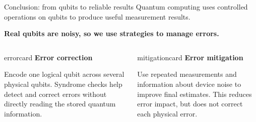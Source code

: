 \begin{frame}{Conclusion: from qubits to reliable results}
  \small
  Quantum computing uses controlled operations on qubits to produce useful
  measurement results.

  \vspace{0.65em}
  \begin{center}
  \end{center}

  \vspace{0.55em}
  \begin{center}
    \textbf{Real qubits are noisy, so we use strategies to manage errors.}
  \end{center}

  \vspace{0.25em}
  \begin{columns}[T,onlytextwidth]
    \begin{beamercolorbox}[wd=\linewidth,sep=0.75em,rounded=true]{errorcard}
      \textbf{Error correction}\par
      \vspace{0.25em}
      Encode one logical qubit across several physical qubits. Syndrome checks
      help detect and correct errors without directly reading the stored
      quantum information.
    \end{beamercolorbox}

    \begin{beamercolorbox}[wd=\linewidth,sep=0.75em,rounded=true]{mitigationcard}
      \textbf{Error mitigation}\par
      \vspace{0.25em}
      Use repeated measurements and information about device noise to improve
      final estimates. This reduces error impact, but does not correct each
      physical error.
    \end{beamercolorbox}
  \end{columns}


\end{frame}
